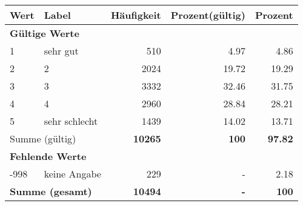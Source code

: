      \begin{longtable}{lXrrr}
     \toprule
     \textbf{Wert} & \textbf{Label} & \textbf{Häufigkeit} & \textbf{Prozent(gültig)} & \textbf{Prozent} \\
     \endhead
     \midrule
     \multicolumn{5}{l}{\textbf{Gültige Werte}}\\

     1 &
     \multicolumn{1}{X}{ sehr gut   } &


       \num{510} &
       \num[round-mode=places,round-precision=2]{4,97} &
         \num[round-mode=places,round-precision=2]{4,86} \\

     2 &
     \multicolumn{1}{X}{ 2   } &


       \num{2024} &
       \num[round-mode=places,round-precision=2]{19,72} &
         \num[round-mode=places,round-precision=2]{19,29} \\

     3 &
     \multicolumn{1}{X}{ 3   } &


       \num{3332} &
       \num[round-mode=places,round-precision=2]{32,46} &
         \num[round-mode=places,round-precision=2]{31,75} \\

     4 &
     \multicolumn{1}{X}{ 4   } &


       \num{2960} &
       \num[round-mode=places,round-precision=2]{28,84} &
         \num[round-mode=places,round-precision=2]{28,21} \\

     5 &
     \multicolumn{1}{X}{ sehr schlecht   } &


       \num{1439} &
       \num[round-mode=places,round-precision=2]{14,02} &
         \num[round-mode=places,round-precision=2]{13,71} \\
     \midrule
     \multicolumn{2}{l}{Summe (gültig)} &
       \textbf{\num{10265}} &
     \textbf{100} &
       \textbf{\num[round-mode=places,round-precision=2]{97,82}} \\
     \multicolumn{5}{l}{\textbf{Fehlende Werte}}\\
       -998 &
       keine Angabe &
         \num{229} &
        - &
         \num[round-mode=places,round-precision=2]{2,18} \\
     \midrule
     \multicolumn{2}{l}{\textbf{Summe (gesamt)}} &
          \textbf{\num{10494}} &
        \textbf{-} &
        \textbf{100} \\
     \bottomrule
     \end{longtable}
     
